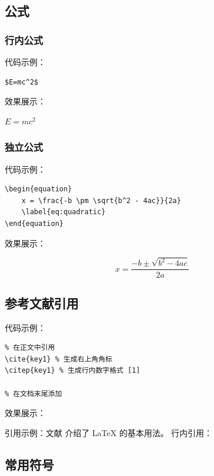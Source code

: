 \subsection{公式}

\subsubsection{行内公式}

代码示例：

\begin{verbatim}
$E=mc^2$
\end{verbatim}

效果展示：

$E=mc^2$

\subsubsection{独立公式}

代码示例：

\begin{verbatim}
\begin{equation}
    x = \frac{-b \pm \sqrt{b^2 - 4ac}}{2a}
    \label{eq:quadratic}
\end{equation}
\end{verbatim}

效果展示：

\begin{equation}
    x = \frac{-b \pm \sqrt{b^2 - 4ac}}{2a}
    \label{eq:demo}
\end{equation}

\subsection{参考文献引用}

代码示例：

\begin{verbatim}
% 在正文中引用
\cite{key1} % 生成右上角角标
\citep{key1} % 生成行内数字格式 [1]

% 在文档末尾添加

\end{verbatim}

效果展示：

引用示例：文献\cite{lamport1994latex} 介绍了 LaTeX 的基本用法。
行内引用：\citep{lamport1994latex}

\subsection{常用符号}

